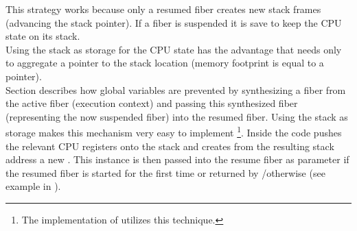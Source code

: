 This strategy works because only a resumed fiber creates new stack frames
(advancing the stack pointer). If a fiber is suspended it is save to keep the
CPU state on its stack.\\

Using the stack as storage for the CPU state has the advantage that \fiber needs
only to aggregate a pointer to the stack location (memory footprint is equal to
a pointer).\\
Section  describes how global variables are prevented
by synthesizing a fiber from the active fiber (execution context) and passing
this synthesized fiber (representing the now suspended fiber) into the resumed
fiber. Using the stack as storage makes this mechanism very easy to implement
\footnote{The implementation of \bcontext\cite{bcontext} utilizes this
technique.}.
Inside \resume the code pushes the relevant CPU registers onto the stack and
creates from the resulting stack address a new \fiber. This instance is then
passed into the resume fiber as parameter if the resumed fiber is started for the
first time or returned by \resume/\resumewith otherwise (see example in
).\\

